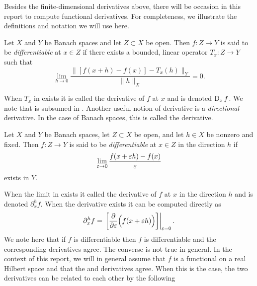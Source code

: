     Besides the finite-dimensional derivatives above, there will be occasion in this report
    to compute functional derivatives. For completeness, we illustrate the
    definitions and notation we will use here.
    \begin{definition}
        \label{def:FrechetDeriv}
        Let \(X\) and \(Y\) be Banach spaces and let \(Z \subset X\) be open. Then
        \(f:Z \to Y\) is said to be \emph{\Frechet differentiable} at \(x \in Z\)
        if there exists a bounded, linear operator \(T_x:Z \to Y\) such that
        \[
            \lim_{h \to 0} \frac{\|[f(x+h) - f(x)] - T_x(h)\|_Y}{\|h\|_X} = 0.
        \]
    \end{definition}
    When \(T_x\) in  exists it is called
    the \Frechet derivative of \(f\) at \(x\) and is denoted \(\operatorname{D}_x f\). We
    note that  is subsumed in .
    Another useful notion of derivative is a \emph{directional} derivative.
    In the case of Banach spaces, this is called the \Gateaux derivative.
    \begin{definition}
        \label{def:GateauxDeriv}
        Let \(X\) and \(Y\) be Banach spaces, let \(Z \subset X\) be open, and
        let \(h \in X\) be nonzero and fixed. Then \(f:Z \to Y\) is said to be 
        \emph{\Gateaux differentiable} at \(x \in Z\) in the direction \(h\)
        if
        \[
            \lim_{\varepsilon \to 0} \frac{f(x + \varepsilon h) - f(x)}{\varepsilon}
        \]
        exists in \(Y\).
    \end{definition}
    When the limit in  exists it called
    the \Gateaux derivative of \(f\) at \(x\) in the direction \(h\)
    and is denoted \(\partial_x^h f\). When the \Gateaux derivative
    exists it can be computed directly as
    \begin{equation}
        \label{eqn:GateauxDeriv}
        \partial_x^h f = \left. \left[ \frac{\partial}{\partial \varepsilon} \Big(f(x + \varepsilon h)\Big) \right] \right|_{\varepsilon = 0}.
    \end{equation}
    We note here that if \(f\) is \Frechet differentiable then \(f\) is \Gateaux
    differentiable and the corresponding derivatives agree.
    The converse is not true in general. In the context of this report, we will 
    in general assume that \(f\) is a functional on a real Hilbert space and
    that the \Frechet and \Gateaux derivatives agree. When this is the case,
    the two derivatives can be related to each other by the following
